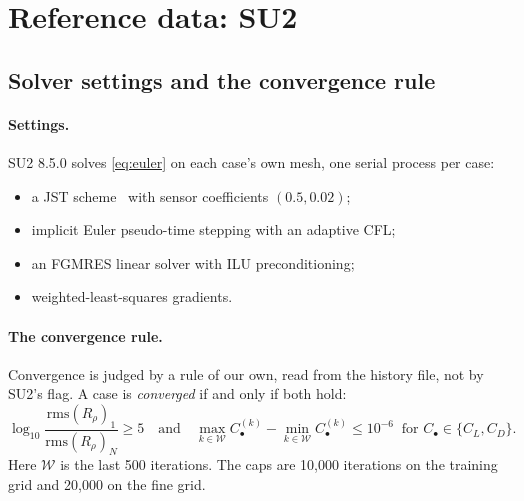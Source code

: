 \documentclass[11pt]{article}
\newcommand{\CL}{C_L}
\newcommand{\CD}{C_D}
\begin{document}
\section{Reference data: SU2}
\label{sec:su2}

\subsection{Solver settings and the convergence rule}

\paragraph{Settings.}
SU2 8.5.0 solves \cref{eq:euler} on each case's own mesh, one serial process per case:
\begin{itemize}
  \item a JST scheme~\cite{jameson1981jst} with sensor coefficients $(0.5, 0.02)$;
  \item implicit Euler pseudo-time stepping with an adaptive CFL;
  \item an FGMRES linear solver with ILU preconditioning;
  \item weighted-least-squares gradients.
\end{itemize}

\paragraph{The convergence rule.}
Convergence is judged by a rule of our own, read from the history file, not by SU2's flag. A case
is \emph{converged} if and only if both hold:
\begin{equation}
  \log_{10}\frac{\mathrm{rms}(R_\rho)_{1}}{\mathrm{rms}(R_\rho)_{N}} \ge 5
  \quad\text{and}\quad
  \max_{k\in\mathcal W}C_\bullet^{(k)} - \min_{k\in\mathcal W}C_\bullet^{(k)} \le 10^{-6}
  \ \text{ for } C_\bullet\in\{\CL,\CD\}.
  \label{eq:conv}
\end{equation}
Here $\mathcal W$ is the last 500 iterations. The caps are 10,000 iterations on the training grid
and 20,000 on the fine grid.
\end{document}
